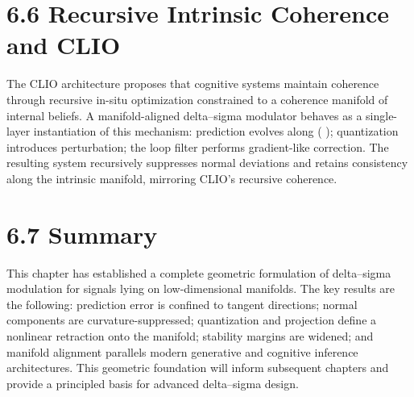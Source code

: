 \section{6.6 Recursive Intrinsic Coherence and CLIO}

The CLIO architecture \citep{cheng2025cognitiveloopinsituoptimization} proposes that cognitive systems maintain coherence through recursive in-situ optimization constrained to a coherence manifold of internal beliefs. A manifold-aligned delta--sigma modulator behaves as a single-layer instantiation of this mechanism: prediction evolves along (  ); quantization introduces perturbation; the loop filter performs gradient-like correction. The resulting system recursively suppresses normal deviations and retains consistency along the intrinsic manifold, mirroring CLIO's recursive coherence.

\section{6.7 Summary}

This chapter has established a complete geometric formulation of delta--sigma modulation for signals lying on low-dimensional manifolds. The key results are the following: prediction error is confined to tangent directions; normal components are curvature-suppressed; quantization and projection define a nonlinear retraction onto the manifold; stability margins are widened; and manifold alignment parallels modern generative and cognitive inference architectures. This geometric foundation will inform subsequent chapters and provide a principled basis for advanced delta--sigma design.
